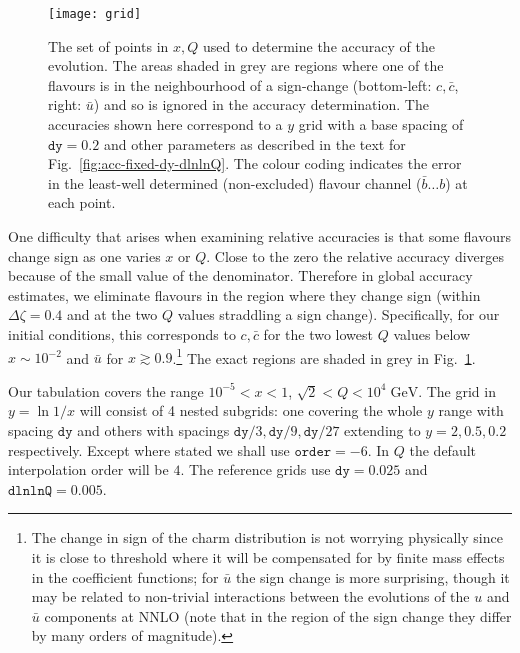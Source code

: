 \documentclass[12pt]{article}
\newcommand{\dy}{\ttt{dy}}
\newcommand{\dlnlnQ}{\ttt{dlnlnQ}}
\newcommand{\GeV}{\;\mathrm{GeV}}
\newcommand{\comment}[1]{\textbf{[#1]}}
\newcommand{\ttt}[1]{\texttt{#1}}
\begin{document}
\begin{figure}
  \centering
  \texttt{[image: grid]}%
  \caption{The set of points in $x, Q$ used to determine the accuracy
    of the evolution. The areas shaded in grey are regions where one
    of the flavours is in the neighbourhood of a sign-change
    (bottom-left: $c,\bar c$, right: $\bar u$) and so is ignored in
    the accuracy determination.  The accuracies shown here correspond
    to a $y$ grid with a base spacing of $\ttt{dy}=0.2$ and other
    parameters as described in the text for
    Fig.~\ref{fig:acc-fixed-dy-dlnlnQ}.
    The colour coding indicates the error in the least-well determined
    (non-excluded) flavour channel ($\bar b \ldots b$) at each point.
  }
  \label{fig:grid}
\end{figure}


One difficulty that arises when examining relative accuracies is that
some flavours change sign as one varies $x$ or $Q$. Close to the zero
the relative accuracy diverges because of the small value of the
denominator. Therefore in global accuracy estimates, we eliminate
flavours in the region where they change sign (within $\Delta
\zeta=0.4$ and at the two $Q$ values straddling a sign
change). Specifically, for our 
initial conditions, this corresponds to $c,\bar c$ for the two lowest
$Q$ values below $x\sim 10^{-2}$ and $\bar u$ for $x\gtrsim
0.9$.\footnote{The change in sign of the charm distribution is not
  worrying physically since it is close to threshold where it will be
  compensated for by finite mass effects in the coefficient functions;
  for $\bar u$ the sign change is more surprising, though it may be
  related to non-trivial interactions between the evolutions of the
  $u$ and $\bar u$ components at NNLO (note that in the region of the
  sign change they differ by many orders of magnitude).  } %
The exact regions are shaded in grey in Fig.~\ref{fig:grid}.

Our tabulation covers the range $10^{-5}<x<1$, $\sqrt{2} < Q<
10^4\GeV$. The grid in $y=\ln1/x$ will consist of 4 nested subgrids:
one covering the whole $y$ range with spacing $\ttt{dy}$ and others
with spacings $\ttt{dy}/3, \ttt{dy}/9, \ttt{dy}/27$ extending to
$y=2,0.5,0.2$ respectively. Except where stated we shall use
$\ttt{order}=-6$. In $Q$ the default interpolation order will be $4$.
The reference grids use $\dy=0.025$ and $\dlnlnQ=0.005$.
\end{document}
